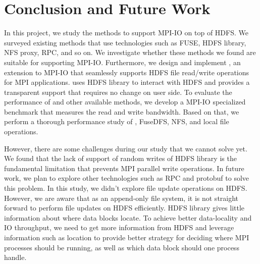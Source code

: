 \section{Conclusion and Future Work}
In this project, we study the methods to support MPI-IO on top of HDFS. We
surveyed existing methods that use technologies such as FUSE, HDFS library, NFS
proxy, RPC, and so on. We investigate whether these methods we found are
suitable for supporting MPI-IO. Furthermore, we design and implement {\proj}, an
extension to MPI-IO that seamlessly supports HDFS file read/write operations for
MPI applications. {\proj} uses HDFS library to interact with HDFS and provides
a transparent support that requires no change on user side. To evaluate the
performance of {\proj} and other available methods, we develop a MPI-IO
specialized benchmark that measures the read and write bandwidth. Based on that,
we perform a thorough performance study of {\proj}, FuseDFS, NFS, and local file
operations.

However, there are some challenges during our study that we cannot solve yet. We
found that the lack of support of random writes of HDFS library is the
fundamental limitation that prevents MPI parallel write operations. In future
work, we plan to explore other technologies such as RPC and protobuf to solve
this problem. In this study, we didn't explore file update operations on HDFS.
However, we are aware that as an append-only file system, it is not straight
forward to perform file updates on HDFS efficiently. HDFS library gives little
information about where data blocks locate. To achieve better data-locality and
IO throughput, we need to get more information from HDFS and leverage
information such as location to provide better strategy for deciding where MPI
processes should be running, as well as which data block should one process
handle.
